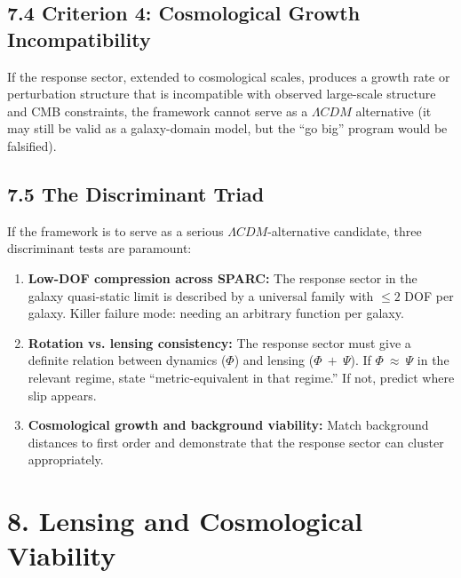 \subsection{7.4 Criterion 4: Cosmological Growth Incompatibility}\label{criterion-4-cosmological-growth-incompatibility}

If the response sector, extended to cosmological scales, produces a growth rate or perturbation structure that is incompatible with observed large-scale structure and CMB constraints, the framework cannot serve as a \(\Lambda CDM\) alternative (it may still be valid as a galaxy-domain model, but the ``go big'' program would be falsified).

\subsection{7.5 The Discriminant Triad}\label{the-discriminant-triad}

If the framework is to serve as a serious \(\Lambda CDM\)-alternative candidate, three discriminant tests are paramount:

\begin{enumerate}
\def\labelenumi{(\roman{enumi})}
\item
  \textbf{Low-DOF compression across SPARC:} The response sector in the galaxy quasi-static limit is described by a universal family with \(\leq 2\) DOF per galaxy. Killer failure mode: needing an arbitrary function per galaxy.
\item
  \textbf{Rotation vs. lensing consistency:} The response sector must give a definite relation between dynamics (\(\Phi\)) and lensing (\(\Phi\  + \ \Psi\)). If \(\Phi\  \approx \ \Psi\) in the relevant regime, state ``metric-equivalent in that regime.'' If not, predict where slip appears.
\item
  \textbf{Cosmological growth and background viability:} Match background distances to first order and demonstrate that the response sector can cluster appropriately.
\end{enumerate}

\section{}\label{section-8}

\section{8. Lensing and Cosmological Viability}\label{lensing-and-cosmological-viability}

